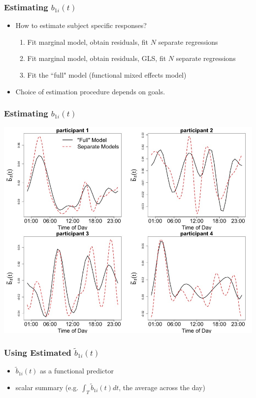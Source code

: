 \documentclass[10pt]{beamer}\usepackage[]{graphicx}\usepackage[]{color}
\begin{document}
\begin{frame}
\frametitle{Estimating $b_{1i}(t)$}
\begin{itemize}
\item How to estimate subject specific responses? 
    \begin{enumerate}
        \item Fit marginal model, obtain residuals, fit $N$ separate regressions
        \item Fit marginal model, obtain residuals, GLS, fit $N$ separate regressions
        \item Fit the ``full" model (functional mixed effects model)
    \end{enumerate}
\item Choice of estimation procedure depends on goals.
\end{itemize}
\end{frame}


\begin{frame}
\frametitle{Estimating $b_{1i}(t)$}
\begin{center}
\includegraphics[width=\textheight]{re_subjs2.jpeg}
\end{center}
\end{frame}

\begin{frame}
\frametitle{Using Estimated $\tilde{b}_{1i}(t)$}
\begin{itemize}
\item $\tilde{b}_{1i}(t)$ as a functional predictor 
\item scalar summary (e.g. $\int_T \tilde{b}_{1i}(t)dt$, the average across the day)
\end{itemize}
\end{frame}
\end{document}
